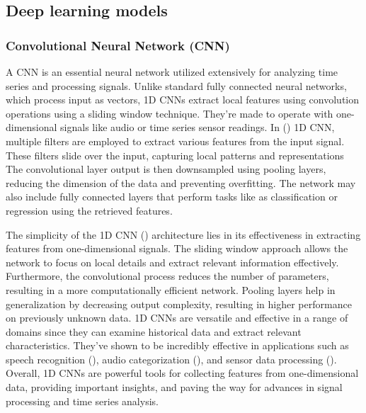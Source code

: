 \documentclass[a4paper, fleqn]{cas-sc}
\theoremstyle{definition}
\theoremstyle{remark}
\begin{document}
\subsection{Deep learning models}
\subsubsection{Convolutional Neural Network (CNN)}
A CNN is an essential neural network utilized extensively for analyzing time series and processing signals. Unlike standard fully connected neural networks,  which process input as vectors,  1D CNNs extract local features using convolution operations using a sliding window technique. They're made to operate with one-dimensional signals like audio or time series sensor readings. In  (\cite{chaerun2021comparative}) 1D CNN,  multiple filters are employed to extract various features from the input signal. These filters slide over the input,  capturing local patterns and representations The convolutional layer output is then downsampled using pooling layers,  reducing the dimension of the data and preventing overfitting. The network may also include fully connected layers that perform tasks like as classification or regression using the retrieved features.

The simplicity of the 1D CNN (\cite{kiranyaz20211d}) architecture lies in its effectiveness in extracting features from one-dimensional signals. The sliding window approach allows the network to focus on local details and extract relevant information effectively. Furthermore,  the convolutional process reduces the number of parameters,  resulting in a more computationally efficient network. Pooling layers help in generalization by decreasing output complexity,  resulting in higher performance on previously unknown data. 1D CNNs are versatile and effective in a range of domains since they can examine historical data and extract relevant characteristics. They've shown to be incredibly effective in applications such as speech recognition (\cite{rusnac2022cnn, wang2019end}),  audio categorization (\cite{ashraf2022role, hu2020device}),  and sensor data processing (\cite{kattenborn2021review, sun2019classification}). Overall,  1D CNNs are powerful tools for collecting features from one-dimensional data,  providing important insights,  and paving the way for advances in signal processing and time series analysis.
\end{document}
